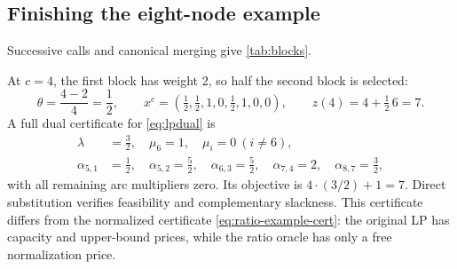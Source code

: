 \subsection{Finishing the eight-node example}
Successive calls and canonical merging give \cref{tab:blocks}.
\begin{table}[htbp]
\centering
\caption{Canonical blocks produced by residual \FS{} calls,
checked against exhaustive closure enumeration.}\label{tab:blocks}
\end{table}
At $c=4$, the first block has weight 2, so half the second block is selected:
\[
 \theta=\frac{4-2}{4}=\frac12,\qquad
 x^c=(\tfrac12,\tfrac12,1,0,\tfrac12,1,0,0),\qquad z(4)=4+\tfrac12\,6=7.
\]
A full dual certificate for \eqref{eq:lpdual} is
\begin{align*}
 \lambda&=\tfrac32,\quad\mu_6=1,\quad\mu_i=0\ (i\ne6),\\
 \alpha_{5,1}&=\tfrac12,\quad\alpha_{5,2}=\tfrac52,\quad
 \alpha_{6,3}=\tfrac52,\quad\alpha_{7,4}=2,\quad\alpha_{8,7}=\tfrac32,
\end{align*}
with all remaining arc multipliers zero. Its objective is
$4\cdot(3/2)+1=7$. Direct substitution verifies feasibility and complementary
slackness. This certificate differs from the normalized certificate
\eqref{eq:ratio-example-cert}: the original LP has capacity and upper-bound
prices, while the ratio oracle has only a free normalization price.

